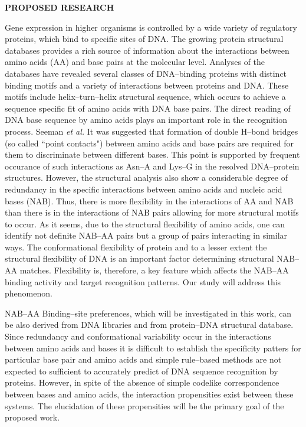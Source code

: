 \newpage


\noindent
{\bf PROPOSED RESEARCH}


Gene expression in higher organisms is controlled
by a wide variety of regulatory proteins, which
bind to specific sites of DNA.
The growing protein structural databases provides
a rich source of information about the interactions
between amino acids (AA) and base pairs at the molecular level.
Analyses of the databases have revealed several classes
of DNA--binding proteins with distinct binding motifs
and a variety of interactions between proteins and DNA.
These motifs include helix--turn--helix structural sequence, 
which occurs to achieve a sequence specific fit of 
amino acids with DNA base pairs. The direct reading of DNA base
sequence by amino acids plays an important role
in the recognition process. 
Seeman {\it et al.}\cite{p1}
It was suggested that formation of double H--bond bridges
(so called ``point contacts") between amino acids
and base pairs are required for them to discriminate
between different bases. This point is supported
by frequent occurance of such interactions as Asn--A
and Lys--G in the resolved DNA--protein structures.
However, the structural analysis also show
a considerable degree of redundancy  in the specific
interactions between amino acids and nucleic acid bases (NAB).
\cite{p2}
Thus, there is more flexibility in the interactions
of AA and NAB than there is in the interactions of NAB pairs
\cite{p3}
allowing for more structural motifs to occur.
As it seems, 
due to the structural flexibility of amino acids, 
one can identify not
definite NAB--AA pairs but a group
of pairs interacting in similar ways.
\cite{p4,p5}
The conformational flexibility of protein and to a lesser
extent the structural flexibility of DNA is an
important factor determining structural NAB--AA matches.
Flexibility is, therefore, a key feature which affects the
NAB--AA binding activity and target recognition patterns. 
\cite{p11}  
Our study will address this phenomenon.


NAB--AA Binding--site preferences, which will be 
investigated in this work, can be also
derived from DNA libraries\cite{p17}
and from protein--DNA
structural database.\cite{p22}
Since redundancy and conformational variability occur in the
interactions between amino acids and bases it is
difficult to establish the specificity patters for
particular base pair and amino acids and
simple rule--based methods are not expected to sufficient to accurately
predict
of DNA sequence recognition by proteins.
However, in spite of the absence of simple codelike
correspondence between bases and amino acids, the interaction 
propensities exist between these systems.\cite{pp}
The elucidation of these propensities will be the primary
goal of the proposed work.

